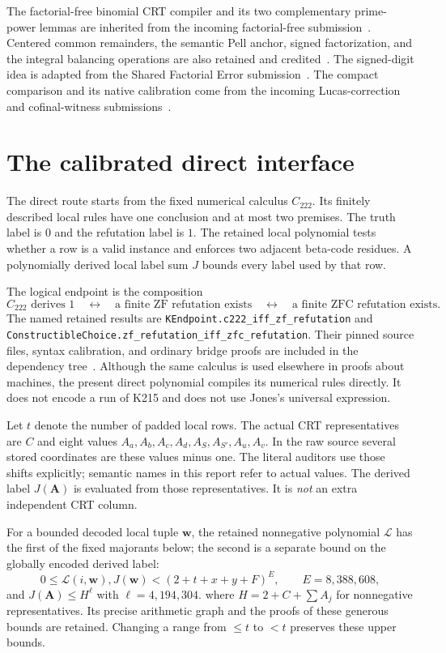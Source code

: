 \documentclass[11pt]{article}
\theoremstyle{definition}
\newcommand{\LL}{\mathcal L}
\newcommand{\calC}{C_{222}}
\begin{document}
The factorial-free binomial CRT compiler and its two complementary
prime-power lemmas are inherited from the incoming factorial-free
submission~\cite{factorialfree}. Centered common remainders, the semantic
Pell anchor, signed factorization, and the integral balancing operations
are also retained and credited~\cite{cofinal,normalized}. The signed-digit
idea is adapted from the Shared Factorial Error submission~\cite{shared}.
The compact comparison and its native calibration come from the incoming
Lucas-correction and cofinal-witness submissions~\cite{lucas,cofinal}.

\section{The calibrated direct interface}
\label{sec:interface}

The direct route starts from the fixed numerical calculus $\calC$.
Its finitely described local rules have one conclusion and at most two
premises. The truth label is $0$ and the refutation label is $1$.
The retained local polynomial tests whether a row is a valid instance
and enforces two adjacent beta-code residues. A polynomially derived
local label sum $J$ bounds every label used by that row.

The logical endpoint is the composition
\[
\calC\text{ derives }1
\quad\longleftrightarrow\quad
\text{a finite ZF refutation exists}
\quad\longleftrightarrow\quad
\text{a finite ZFC refutation exists}.
\]
The named retained results are
\nolinkurl{KEndpoint.c222_iff_zf_refutation} and
\nolinkurl{ConstructibleChoice.zf_refutation_iff_zfc_refutation}.
Their pinned source files, syntax calibration, and ordinary bridge proofs
are included in the dependency tree~\cite{calibration}. Although the
same calculus is used elsewhere in proofs about machines, the present
direct polynomial compiles its numerical rules directly. It does not
encode a run of K215 and does not use Jones's universal expression.

Let $t$ denote the number of padded local rows. The actual CRT
representatives are $C$ and eight values
$A_a,A_b,A_c,A_d,A_S,A_{S'},A_u,A_v$. In the raw source several stored
coordinates are these values minus one. The literal auditors use those
shifts explicitly; semantic names in this report refer to actual values.
The derived label $J(\boldsymbol A)$ is evaluated from those
representatives. It is \emph{not} an extra independent CRT column.

For a bounded decoded local tuple $\boldsymbol w$, the retained
nonnegative polynomial $\LL$ has the first of the fixed majorants below;
the second is a separate bound on the globally encoded derived label:
\begin{equation}\label{eq:majorants}
0\le\LL(i,\boldsymbol w),J(\boldsymbol w)<(2+t+x+y+F)^E,
\qquad E=8{,}388{,}608,
\end{equation}
and $J(\boldsymbol A)\le H^\ell$ with $\ell=4{,}194{,}304$.
where $H=2+C+\sum A_j$ for nonnegative representatives. Its precise
arithmetic graph and the proofs of these generous bounds are retained.
Changing a range from $\le t$ to $<t$ preserves these upper bounds.
\end{document}
